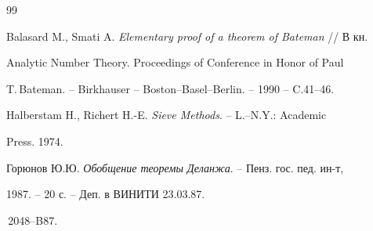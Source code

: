 \begin{thebibliography}{99} 


 




Balasard M., Smati A. {\em Elementary proof of a theorem of Bateman} // В кн. 


Analytic Number Theory. Proceedings of Conference in Honor of Paul 


T.\,Bateman. -- Birkhauser -- Boston--Basel--Berlin. -- 1990 -- C.41--46. 


 




Halberstam H., Richert H.-E. {\em Sieve Methods}. -- L.--N.Y.: Academic 


Press. 1974. 


 




Горюнов Ю.Ю. {\em Обобщение теоремы Деланжа}. -- Пенз. гос. пед. ин-т,


1987. -- 20 с. -- Деп. в ВИНИТИ 23.03.87.


\No\,2048--B87. 


 


 


\end{thebibliography} 


 


\vskip 2cm 


 






 




 


